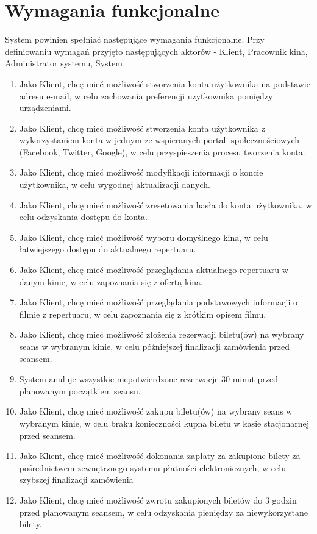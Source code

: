 \section{Wymagania funkcjonalne}
\label{sec:func}
System powinien spełniać następujące wymagania funkcjonalne. Przy definiowaniu wymagań przyjęto następujących aktorów - Klient, Pracownik kina, Administrator systemu, System 
\begin{enumerate}
\item Jako Klient, chcę mieć możliwość stworzenia konta użytkownika na podstawie adresu e-mail, w celu zachowania preferencji użytkownika pomiędzy urządzeniami.
\item Jako Klient, chcę mieć możliwość stworzenia konta użytkownika z wykorzystaniem konta w jednym ze wspieranych portali społecznościowych (Facebook, Twitter, Google), w celu przyspieszenia procesu tworzenia konta.
\item Jako Klient, chcę mieć możliwość modyfikacji informacji o koncie użytkownika, w celu wygodnej aktualizacji danych.
\item Jako Klient, chcę mieć możliwość zresetowania hasła do konta użytkownika, w celu odzyskania dostępu do konta. 
\item Jako Klient, chcę mieć możliwość wyboru domyślnego kina, w celu łatwiejszego dostępu do aktualnego repertuaru.
\item Jako Klient, chcę mieć możliwość przeglądania aktualnego repertuaru w danym kinie, w celu zapoznania się z ofertą kina.
\item Jako Klient, chcę mieć możliwość przeglądania podstawowych informacji o filmie z repertuaru, w celu zapoznania się z krótkim opisem filmu. 
\item Jako Klient, chcę mieć możliwość złożenia rezerwacji biletu(ów) na wybrany seans w wybranym kinie, w celu późniejszej finalizacji zamówienia przed seansem.
\item System anuluje wszystkie niepotwierdzone rezerwacje 30 minut przed planowanym początkiem seansu. 
\item Jako Klient, chcę mieć możliwość zakupu biletu(ów) na wybrany seans w wybranym kinie, w celu braku konieczności kupna biletu w kasie stacjonarnej przed seansem.
\item Jako Klient, chcę mieć możliwość dokonania zapłaty za zakupione bilety za pośrednictwem zewnętrznego systemu płatności elektronicznych, w celu szybszej finalizacji zamówienia
\item Jako Klient, chcę mieć możliwość zwrotu zakupionych biletów do 3 godzin przed planowanym seansem, w celu odzyskania pieniędzy za niewykorzystane bilety.

\end{enumerate}
